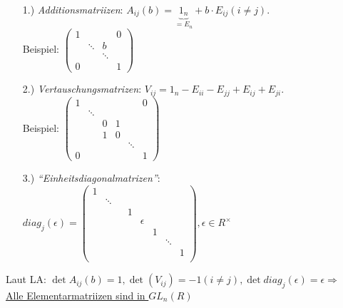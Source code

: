 \documentclass[a4paper,twoside,DIV15,BCOR12mm]{scrbook}
\begin{document}
\begin{itemize}
    \item[1.)] \emph{Additionsmatriizen}: $A_{ij}(b) = \underbrace{1_n}_{= E_n} + b\cdot E_{ij} (i \not= j)$.\\
        Beispiel: $\begin{pmatrix}1 & & & 0\\
                                  & \ddots & b \\
                                  & & \ddots & \\
                                0 & & & 1\end{pmatrix}$\\
  \item[2.)] \emph{Vertauschungsmatrizen}: $V_{ij} = 1_n - E_{ii} - E_{jj} + E_{ij} + E_{ji}$.\\
    Beispiel: $\begin{pmatrix}1 & & & & & 0 \\
                                  & \ddots & & & & \\
                                  & & 0 & 1 & & \\
                                  & & 1 & 0 & & \\
                                  & & & & \ddots & \\
                                0 & & & & & 1\end{pmatrix}$\\
  \item[3.)] \emph{"`Einheitsdiagonalmatrizen"'}: \\
    $diag_j(\epsilon) = \begin{pmatrix}1 & & & & & & \\
                                                                             & \ddots & & & & & & \\
                                                                             & & & 1 & & & & \\
                                                                             & & & & \epsilon & & \\
                                                                             & & & & & 1 & & \\
                                                                             & & & & & & \ddots & \\
                                                                             & & & & & & & 1\\\end{pmatrix}, \epsilon \in R^\times$
\end{itemize}
Laut LA: $\det A_{ij}(b) =1, \det(V_{ij}) = -1 (i \not= j), \det diag_j(\epsilon) = \epsilon \Rightarrow$ \\
\underline{Alle Elementarmatriizen sind in $GL_n(R)$}
\end{document}
